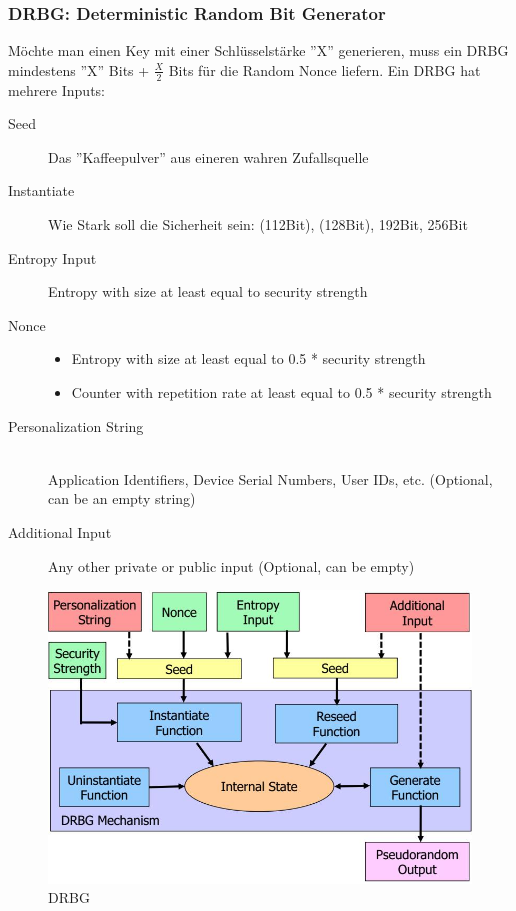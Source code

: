 \subsubsection{DRBG: Deterministic Random Bit Generator}
Möchte man einen Key mit einer Schlüsselstärke ''X'' generieren, muss ein DRBG mindestens ''X'' Bits +  $\frac{X}{2}$ Bits für die Random Nonce liefern. Ein DRBG hat mehrere Inputs:
\begin{description}
	\item[Seed]	Das ''Kaffeepulver'' aus eineren wahren Zufallsquelle
	\item[Instantiate] Wie Stark soll die Sicherheit sein: (112Bit), (128Bit), 192Bit, 256Bit
	\item[Entropy Input] Entropy with size at least equal to security strength
	\item[Nonce] \hfill 
	\begin{itemize} 
		\item Entropy with size at least equal to 0.5 * security strength
		\item Counter with repetition rate at least equal to 0.5 * security strength
	\end{itemize}
	\item[Personalization String]  \hfill \\
	Application Identifiers, Device Serial Numbers, User IDs, etc. (Optional, can be an empty string)
	\item[Additional Input] Any other private or public input (Optional, can be empty)
\end{description}
\begin{figure}[h]
\centering
\includegraphics[width=0.5\linewidth]{images/drbg}
\caption{DRBG}
\label{fig:drbg}
\end{figure}

